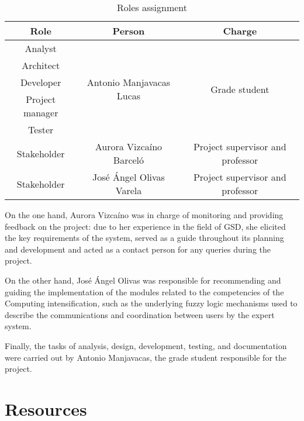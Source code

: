 \begin{table}[htb]
	\centering
	\caption[Roles assignment]{Roles assignment}
	\label{tb:roles}
	\begin{tabular}{|c|c|c|}
	\hline
	\textbf{Role}   & \textbf{Person}                           & \textbf{Charge}                  \\ \hline\hline
	Analyst         & \multirow{5}{*}{Antonio Manjavacas Lucas} & \multirow{5}{*}{Grade student}   \\ \cline{1-1}
	Architect       &                                           &                                  \\ \cline{1-1}
	Developer       &                                           &                                  \\ \cline{1-1}
	Project manager &                                           &                                  \\ \cline{1-1}
	Tester          &                                           &                                  \\ \hline
	Stakeholder     & Aurora Vizcaíno Barceló                   & Project supervisor and professor \\ \hline
	Stakeholder     & José Ángel Olivas Varela                  & Project supervisor and professor \\ \hline
	\end{tabular}
\end{table}


On the one hand, Aurora Vizcaíno was in charge of monitoring and providing feedback on the project: due to her experience in the field of GSD, she elicited the key requirements of the system, served as a guide throughout its planning and development and acted as a contact person for any queries during the project.

On the other hand, José Ángel Olivas was responsible for recommending and guiding the implementation of the modules related to the competencies of the Computing intensification, such as the underlying fuzzy logic mechanisms used to describe the communications and coordination between users by the expert system.

Finally, the tasks of analysis, design, development, testing, and documentation were carried out by Antonio Manjavacas, the grade student responsible for the project.

\section{Resources}
\label{sec:resources}

